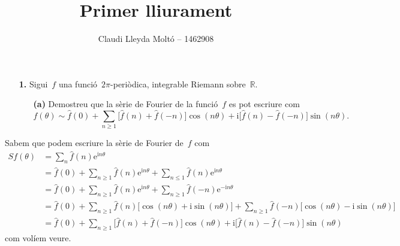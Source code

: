 \documentclass[a4paper]{article}
\title{Primer lliurament}
\author{Claudi Lleyda Moltó -- 1462908}
\newcommand{\iu}{\mathrm{i}}
\newcommand{\e}{\mathrm{e}}
\providecommand{\uppi}{\pi}
\begin{document}
\maketitle

\begin{enumerate}
    \item[\textbf{1.}] Sigui~\(f\) una funció~\(2\uppi\)-periòdica, integrable
        Riemann sobre~\(\mathbb{R}\).
        \begin{enumerate}
            \item[\textbf{(a)}] Demostreu que la sèrie de Fourier de la
                funció~\(f\) es pot escriure com
                \[
                    f(\theta) \sim \widehat{f}(0) +
                    \sum_{n\geq1} \bigl[\widehat{f}(n) + \widehat{f}(-n)\bigr]
                    \cos(n\theta)
                    +
                    \iu\bigl[\widehat{f}(n)-\widehat{f}(-n)\bigr]\sin(n\theta).
                \]
        \end{enumerate}
\end{enumerate}
Sabem que podem escriure la sèrie de Fourier de~\(f\) com
\begin{align*}
    Sf(\theta) &= \sum_{n} \widehat{f}(n) \e^{\iu n\theta} \\
                 &= \widehat{f}(0)
                 + \sum_{n\geq1} \widehat{f}(n) \e^{\iu n\theta}
                 + \sum_{n\leq1} \widehat{f}(n) \e^{\iu n\theta}
                 \\
                 &= \widehat{f}(0)
                 + \sum_{n\geq1} \widehat{f}(n) \e^{\iu n\theta}
                 + \sum_{n\geq1} \widehat{f}(-n) \e^{-\iu n\theta} \\
                 &= \widehat{f}(0)
                 + \sum_{n\geq1} \widehat{f}(n)
                 \bigl[\cos(n\theta) + \iu\sin(n\theta)\bigr]
                 + \sum_{n\geq1} \widehat{f}(-n)
                 \bigl[\cos(n\theta) - \iu\sin(n\theta)\bigr] \\
                 &= \widehat{f}(0)
                 + \sum_{n\geq1}
                 \bigl[\widehat{f}(n)+\widehat{f}(-n)\bigr]\cos(n\theta)
                 + \iu\bigl[\widehat{f}(n)-\widehat{f}(-n)\bigr]\sin(n\theta)
\end{align*}
com volíem veure.
\end{document}
